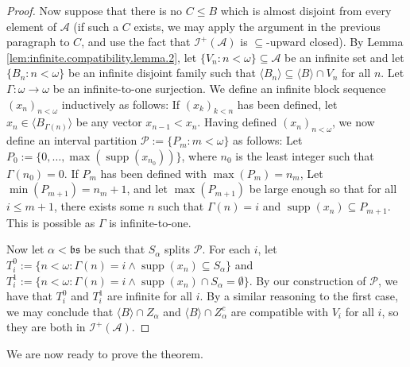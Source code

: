 \documentclass[10pt,a4paper]{amsart}
\theoremstyle{plain}
\numberwithin{equation}{section}
\theoremstyle{definition}
\newcommand{\func}{\operatorname}
\renewcommand{\c}[1]{\langle #1 \rangle}
\newcommand{\Po}{\cal{P}}
\newcommand{\cal}{\mathcal}
\renewcommand{\frak}{\mathfrak}
\newcommand{\supp}{\func{supp}}
\newcommand{\A}{\cal{A}}
\newcommand{\I}{\cal{I}}
\begin{document}
\begin{proof}
    Now suppose that there is no $C \leq B$ which is almost disjoint from every element of $\A$ (if such a $C$ exists, we may apply the argument in the previous paragraph to $C$, and use the fact that $\I^+(\A)$ is $\subseteq$-upward closed). By Lemma \ref{lem:infinite.compatibility.lemma.2}, let $\{V_n : n < \omega\} \subseteq \A$ be an infinite set and let $\{B_n : n < \omega\}$ be an infinite disjoint family such that $\c{B_n} \subseteq \c{B} \cap V_n$ for all $n$. Let $\Gamma : \omega \to \omega$ be an infinite-to-one surjection. We define an infinite block sequence $(x_n)_{n<\omega}$ inductively as follows: If $(x_k)_{k<n}$ has been defined, let $x_n \in \c{B_{\Gamma(n)}}$ be any vector $x_{n-1} < x_n$. Having defined $(x_n)_{n<\omega}$, we now define an interval partition $\Po := \{P_m : m < \omega\}$ as follows: Let $P_0 := \{0,\dots,\max(\supp(x_{n_0}))\}$, where $n_0$ is the least integer such that $\Gamma(n_0) = 0$. If $P_m$ has been defined with $\max(P_m) = n_m$, Let $\min(P_{m+1}) = n_m + 1$, and let $\max(P_{m+1})$ be large enough so that for all $i \leq m+1$, there exists some $n$ such that $\Gamma(n) = i$ and $\supp(x_n) \subseteq P_{m+1}$. This is possible as $\Gamma$ is infinite-to-one. 

    Now let $\alpha < \frak{bs}$ be such that $S_\alpha$ splits $\Po$. For each $i$, let $T_i^0 := \{n < \omega : \Gamma(n) = i \wedge \supp(x_n) \subseteq S_\alpha\}$ and $T_i^1 := \{n < \omega : \Gamma(n) = i \wedge \supp(x_n) \cap S_\alpha = \emptyset\}$. By our construction of $\Po$, we have that $T_i^0$ and $T_i^1$ are infinite for all $i$. By a similar reasoning to the first case, we may conclude that $\c{B} \cap Z_\alpha$ and $\c{B} \cap Z_\alpha^c$ are compatible with $V_i$ for all $i$, so they are both in $\I^+(\A)$.
\end{proof}

We are now ready to prove the theorem.
\end{document}
